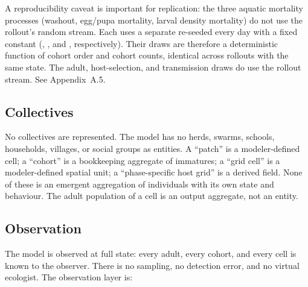 \documentclass[11pt,a4paper]{article}
\newcommand{\code}[1]{\path{#1}}
\begin{document}
A reproducibility caveat is important for replication: the three
aquatic mortality processes (washout, egg/pupa mortality, larval
density mortality) do not use the rollout's random stream. Each uses a
separate \code{std::mt19937_64} re-seeded every day with a fixed
constant (, , and
, respectively). Their draws are therefore a
deterministic function of cohort order and cohort counts, identical
across rollouts with the same state. The adult, host-selection, and
transmission draws do use the rollout stream. See Appendix~A.5.

\subsection{Collectives}

No collectives are represented. The model has no herds, swarms, schools,
households, villages, or social groups as entities. A ``patch'' is a
modeler-defined cell; a ``cohort'' is a bookkeeping aggregate of
immatures; a ``grid cell'' is a modeler-defined spatial unit; a
``phase-specific host grid'' is a derived field. None of these is an
emergent aggregation of individuals with its own state and behaviour.
The adult population of a cell is an output aggregate, not an entity.

\subsection{Observation}

The model is observed at full state: every adult, every cohort, and
every cell is known to the observer. There is no sampling, no detection
error, and no virtual ecologist. The observation layer is:
\end{document}
